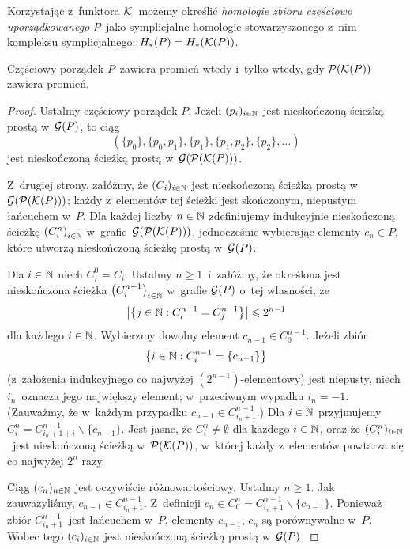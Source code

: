 Korzystając z~funktora $\mathcal{K}$~możemy określić \textit{homologie zbioru częściowo uporządkowanego} $P$~jako symplicjalne homologie stowarzyszonego z~nim kompleksu symplicjalnego: $H_*(P)=H_*(\mathcal{K}(P))$.

\begin{lem}\label{lem-porządek_bez_promieni_wtw_podzial_barycentryczny}
Częściowy porządek $P$~zawiera promień wtedy i~tylko wtedy, gdy $\mathcal{P}(\mathcal{K}(P))$ zawiera promień.
\end{lem}
\begin{proof}
Ustalmy częściowy porządek $P$. Jeżeli $(p_i)_{i\in\mathbb{N}}$ jest nieskończoną ścieżką prostą w~$\mathcal{G}(P)$, to ciąg \[\left(\{p_0\},\{p_0,p_1\},\{p_1\},\{p_1,p_2\},\{p_2\},\ldots\right)\] jest nieskończoną ścieżką prostą w~$\mathcal{G}(\mathcal{P}(\mathcal{K}(P)))$.

Z~drugiej strony, załóżmy, że $(C_i)_{i\in\mathbb{N}}$ jest nieskończoną ścieżką prostą w~$\mathcal{G}(\mathcal{P}(\mathcal{K}(P)))$; każdy z~elementów tej ścieżki jest skończonym, niepustym łańcuchem w~$P$. Dla każdej liczby $n\in \mathbb{N}$ zdefiniujemy indukcyjnie nieskończoną ścieżkę $\left(C_i^n\right)_{i\in\mathbb{N}}$ w~grafie~$\mathcal{G}(\mathcal{P}(\mathcal{K}(P)))$, jednocześnie wybierając elementy $c_n\in P$, które utworzą nieskończoną ścieżkę prostą w~$\mathcal{G}(P)$. 

Dla $i\in\mathbb{N}$ niech $C_i^0=C_i$. Ustalmy $n\geq 1$~i~załóżmy, że określona jest nieskończona ścieżka $\bigl(C_i^{n-1}\bigr)_{i\in\mathbb{N}}$ w~grafie $\mathcal{G}(P)$ o~tej własności, że \[\left|\left\{j\in\mathbb{N}:C_i^{n-1}=C_j^{n-1}\right\}\right|\leqslant 2^{n-1}\] dla każdego $i\in \mathbb{N}$. Wybierzmy dowolny element $c_{n-1}\in C_0^{n-1}$. Jeżeli zbiór \[\left\{i\in \mathbb{N}:C_i^{n-1}=\{c_{n-1}\}\right\}\] (z~założenia indukcyjnego co najwyżej $(2^{n-1})$-elementowy) jest niepusty, niech $i_n$~oznacza jego największy element; w~przeciwnym wypadku $i_n=-1$. (Zauważmy, że w~każdym przypadku $c_{n-1}\in  C^{n-1}_{i_n+1}$.) Dla $i\in\mathbb{N}$ przyjmujemy $C_i^n=C^{n-1}_{i_n+1+i}\smallsetminus\{c_{n-1}\}$. 
Jest jasne, że $C_i^n\not=\emptyset$ dla każdego $i\in\mathbb{N}$, oraz że $(C_i^n)_{i\in\mathbb{N}}$~jest nieskończoną ścieżką w~$\mathcal{P}(\mathcal{K}(P))$, w~której każdy z~elementów powtarza się co najwyżej $2^n$ razy.

Ciąg $(c_n)_{n\in\mathbb{N}}$ jest oczywiście różnowartościowy. Ustalmy $n\geq 1$. Jak zauważyliśmy, $c_{n-1}\in C^{n-1}_{i_n+1}$. Z~definicji $c_{n}\in C^{n}_0=C^{n-1}_{i_n+1}\smallsetminus\{c_{n-1}\}$. Ponieważ zbiór $C^{n-1}_{i_n+1}$~jest łańcuchem w~$P$, elementy $c_{n-1}$, $c_{n}$ są porównywalne w~$P$. Wobec tego $(c_i)_{i\in\mathbb{N}}$ jest nieskończoną ścieżką prostą w~$\mathcal{G}(P)$. 
\end{proof}

